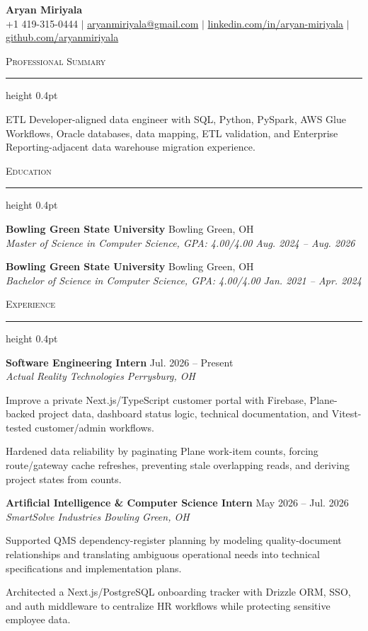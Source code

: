 \documentclass[letterpaper,11pt]{article}
\newcommand{\resumesection}[1]{%
  \par\vspace{2pt}%
  {\large\scshape #1}\par\vspace{2pt}%
  \hrule height 0.4pt\vspace{2pt}%
}
\newcommand{\resumeSubheading}[4]{
  \textbf{#1} \hfill #2\\
  \textit{#3} \hfill \textit{#4}
}
\begin{document}
\begin{center}
  {\LARGE \textbf{Aryan Miriyala}}\\[-1pt]
  \small
  +1 419-315-0444 $|$
  \href{mailto:aryanmiriyala@gmail.com}{aryanmiriyala@gmail.com} $|$
  \href{https://www.linkedin.com/in/aryan-miriyala-7788a21b6/}{linkedin.com/in/aryan-miriyala} $|$
  \href{https://github.com/aryanmiriyala}{github.com/aryanmiriyala}
\end{center}\vspace{-10pt}

\resumesection{Professional Summary}
ETL Developer-aligned data engineer with SQL, Python, PySpark, AWS Glue Workflows, Oracle databases, data mapping, ETL validation, and Enterprise Reporting-adjacent data warehouse migration experience.

\resumesection{Education}
\resumeSubheading
{Bowling Green State University}{Bowling Green, OH}
{Master of Science in Computer Science, GPA: 4.00/4.00}{Aug. 2024 -- Aug. 2026}

\resumeSubheading
{Bowling Green State University}{Bowling Green, OH}
{Bachelor of Science in Computer Science, GPA: 4.00/4.00}{Jan. 2021 -- Apr. 2024}

\resumesection{Experience}
\resumeSubheading
{Software Engineering Intern}{Jul. 2026 -- Present}
{Actual Reality Technologies}{Perrysburg, OH}
\begin{tightitemize}
  \item Improve a private Next.js/TypeScript customer portal with Firebase, Plane-backed project data, dashboard status logic, technical documentation, and Vitest-tested customer/admin workflows.
  \item Hardened data reliability by paginating Plane work-item counts, forcing route/gateway cache refreshes, preventing stale overlapping reads, and deriving project states from counts.
\end{tightitemize}

\resumeSubheading
{Artificial Intelligence \& Computer Science Intern}{May 2026 -- Jul. 2026}
{SmartSolve Industries}{Bowling Green, OH}
\begin{tightitemize}
  \item Supported QMS dependency-register planning by modeling quality-document relationships and translating ambiguous operational needs into technical specifications and implementation plans.
  \item Architected a Next.js/PostgreSQL onboarding tracker with Drizzle ORM, SSO, and auth middleware to centralize HR workflows while protecting sensitive employee data.
\end{tightitemize}
\end{document}
